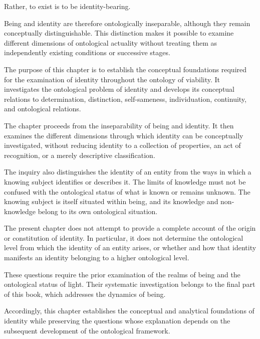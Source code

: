 Rather, to exist is to be identity-bearing.

Being and identity are therefore ontologically
inseparable, although they remain conceptually
distinguishable. This distinction makes it possible
to examine different dimensions of ontological
actuality without treating them as independently
existing conditions or successive stages.

The purpose of this chapter is to establish the
conceptual foundations required for the examination
of identity throughout the ontology of viability.
It investigates the ontological problem of identity
and develops its conceptual relations to determination,
distinction, self-sameness, individuation, continuity,
and ontological relations.

The chapter proceeds from the inseparability of being
and identity. It then examines the different dimensions
through which identity can be conceptually investigated,
without reducing identity to a collection of properties,
an act of recognition, or a merely descriptive
classification.

The inquiry also distinguishes the identity of an
entity from the ways in which a knowing subject
identifies or describes it. The limits of knowledge
must not be confused with the ontological status of
what is known or remains unknown. The knowing subject
is itself situated within being, and its knowledge
and non-knowledge belong to its own ontological
situation.

The present chapter does not attempt to provide a
complete account of the origin or constitution of
identity. In particular, it does not determine the
ontological level from which the identity of an entity
arises, or whether and how that identity manifests
an identity belonging to a higher ontological level.

These questions require the prior examination of
the realms of being and the ontological status of
light. Their systematic investigation belongs to
the final part of this book, which addresses the
dynamics of being.

Accordingly, this chapter establishes the conceptual
and analytical foundations of identity while
preserving the questions whose explanation depends
on the subsequent development of the ontological
framework.



